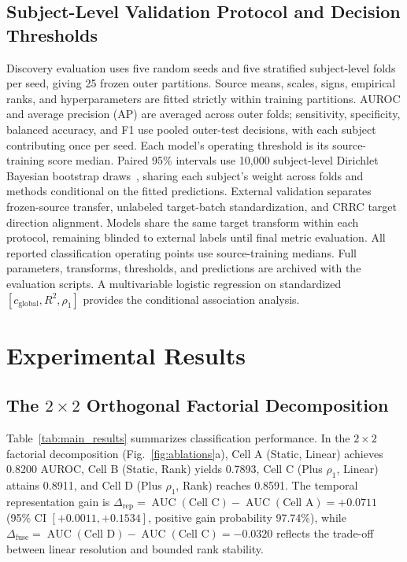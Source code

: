 \documentclass[journal,twoside,web]{ieeecolor}
\begin{document}
\subsection{Subject-Level Validation Protocol and Decision Thresholds}
Discovery evaluation uses five random seeds and five stratified subject-level folds per seed, giving 25 frozen outer partitions. Source means, scales, signs, empirical ranks, and hyperparameters are fitted strictly within training partitions. AUROC and average precision (AP) are averaged across outer folds; sensitivity, specificity, balanced accuracy, and F1 use pooled outer-test decisions, with each subject contributing once per seed. Each model's operating threshold is its source-training score median. Paired 95\% intervals use 10,000 subject-level Dirichlet Bayesian bootstrap draws~\cite{rubin1981bayesian}, sharing each subject's weight across folds and methods conditional on the fitted predictions. External validation separates frozen-source transfer, unlabeled target-batch standardization, and CRRC target direction alignment. Models share the same target transform within each protocol, remaining blinded to external labels until final metric evaluation. All reported classification operating points use source-training medians. Full parameters, transforms, thresholds, and predictions are archived with the evaluation scripts. A multivariable logistic regression on standardized $[c_{\text{global}}, R^2, \rho_1]$ provides the conditional association analysis.

\section{Experimental Results}

\subsection{The $2 \times 2$ Orthogonal Factorial Decomposition}

Table~\ref{tab:main_results} summarizes classification performance. In the $2 \times 2$ factorial decomposition (Fig.~\ref{fig:ablations}a), Cell A (Static, Linear) achieves 0.8200 AUROC, Cell B (Static, Rank) yields 0.7893, Cell C (Plus $\rho_1$, Linear) attains 0.8911, and Cell D (Plus $\rho_1$, Rank) reaches 0.8591. The temporal representation gain is $\Delta_{\text{rep}} = \operatorname{AUC}(\text{Cell C}) - \operatorname{AUC}(\text{Cell A}) = +0.0711$ (95\% CI $[+0.0011, +0.1534]$, positive gain probability 97.74\%), while $\Delta_{\text{fuse}} = \operatorname{AUC}(\text{Cell D}) - \operatorname{AUC}(\text{Cell C}) = -0.0320$ reflects the trade-off between linear resolution and bounded rank stability.
\end{document}
